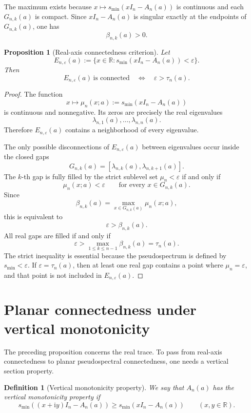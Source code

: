 \documentclass[11pt]{amsart}
\numberwithin{equation}{section}
\newcommand{\R}{\mathbb R}
\newcommand{\eps}{\varepsilon}
\newcommand{\ii}{\mathrm i}
\newtheorem{proposition}[theorem]{Proposition}
\newtheorem{definition}[theorem]{Definition}
\begin{document}
The maximum exists because \(x\mapsto s_{\min}(xI_n-A_n(a))\) is continuous and each \(G_{n,k}(a)\) is compact.  Since \(xI_n-A_n(a)\) is singular exactly at the endpoints of \(G_{n,k}(a)\), one has
\[
\beta_{n,k}(a)>0.
\]

\begin{proposition}[Real-axis connectedness criterion]\label{prop:real-axis-connectedness}
Let
\[
E_{n,\eps}(a)
:=
\{x\in\R:s_{\min}(xI_n-A_n(a))<\eps\}.
\]
Then
\[
E_{n,\eps}(a)\ \text{is connected}
\quad\Longleftrightarrow\quad
\eps>\tau_n(a).
\]
\end{proposition}

\begin{proof}
The function
\[
x\mapsto\mu_n(x;a):=s_{\min}(xI_n-A_n(a))
\]
is continuous and nonnegative.  Its zeros are precisely the real eigenvalues
\[
\lambda_{n,1}(a),\dots,\lambda_{n,n}(a).
\]
Therefore \(E_{n,\eps}(a)\) contains a neighborhood of every eigenvalue.

The only possible disconnections of \(E_{n,\eps}(a)\) between eigenvalues occur inside the closed gaps
\[
G_{n,k}(a)=[\lambda_{n,k}(a),\lambda_{n,k+1}(a)].
\]
The \(k\)-th gap is fully filled by the strict sublevel set \(\mu_n<\eps\) if and only if
\[
\mu_n(x;a)<\eps
\qquad
\text{for every }x\in G_{n,k}(a).
\]
Since
\[
\beta_{n,k}(a)=\max_{x\in G_{n,k}(a)}\mu_n(x;a),
\]
this is equivalent to
\[
\eps>\beta_{n,k}(a).
\]
All real gaps are filled if and only if
\[
\eps>\max_{1\le k\le n-1}\beta_{n,k}(a)=\tau_n(a).
\]
The strict inequality is essential because the pseudospectrum is defined by \(s_{\min}<\eps\).  If \(\eps=\tau_n(a)\), then at least one real gap contains a point where \(\mu_n=\eps\), and that point is not included in \(E_{n,\eps}(a)\).
\end{proof}

\section{Planar connectedness under vertical monotonicity}

The preceding proposition concerns the real trace.  To pass from real-axis connectedness to planar pseudospectral connectedness, one needs a vertical section property.

\begin{definition}[Vertical monotonicity property]\label{def:vertical}
We say that \(A_n(a)\) has the vertical monotonicity property if
\[
s_{\min}((x+\ii y)I_n-A_n(a))
\ge
s_{\min}(xI_n-A_n(a))
\qquad
(x,y\in\R).
\]
\end{definition}
\end{document}
